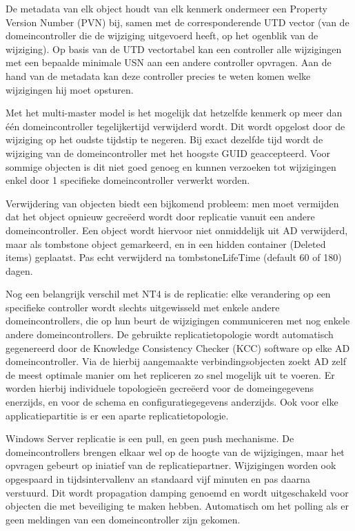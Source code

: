 De metadata van elk object houdt van elk kenmerk ondermeer een Property Version
Number (PVN) bij, samen met de corresponderende UTD vector (van de
domeincontroller die de wijziging uitgevoerd heeft, op het ogenblik van de
wijziging). Op basis van de UTD vectortabel kan een controller alle wijzigingen
met een bepaalde minimale USN aan een andere controller opvragen. Aan de hand
van de metadata kan deze controller precies te weten komen welke wijzigingen hij
moet opsturen.

Met het multi-master model is het mogelijk dat hetzelfde kenmerk op meer dan één
domeincontroller tegelijkertijd verwijderd wordt. Dit wordt opgelost door de
wijziging op het oudste tijdstip te negeren. Bij exact dezelfde tijd wordt de
wijziging van de domeincontroller met het hoogste GUID geaccepteerd. Voor
sommige objecten is dit niet goed genoeg en kunnen verzoeken tot wijzigingen
enkel door 1 specifieke domeincontroller verwerkt worden.

Verwijdering van objecten biedt een bijkomend probleem: men moet vermijden dat
het object opnieuw gecreëerd wordt door replicatie vanuit een andere
domeincontroller. Een object wordt hiervoor niet onmiddelijk uit AD verwijderd,
maar als tombstone object gemarkeerd, en in een hidden container (Deleted items)
geplaatst. Pas echt verwijderd na tombstoneLifeTime (default 60 of 180) dagen.

Nog een belangrijk verschil met NT4 is de  replicatie:
elke verandering op een specifieke controller wordt slechts uitgewisseld met
enkele andere domeincontrollers, die op hun beurt de wijzigingen communiceren
met nog enkele andere domeincontrollers. De gebruikte replicatietopologie wordt
automatisch gegenereerd door de Knowledge Consistency Checker (KCC) software op
elke AD domeincontroller. Via de hierbij aangemaakte verbindingsobjecten zoekt
AD zelf de meest optimale manier om het repliceren zo snel mogelijk uit te
voeren. Er worden hierbij individuele topologieën gecreëerd voor de
domeingegevens enerzijds, en voor de schema en configuratiegegevens anderzijds.
Ook voor elke applicatiepartitie is er een aparte replicatietopologie.

Windows Server replicatie is een pull, en geen push mechanisme. De
domeincontrollers brengen elkaar wel op de hoogte van de wijzigingen, maar het
opvragen gebeurt op iniatief van de replicatiepartner. Wijzigingen worden ook
opgespaard in tijdsintervallenv an standaard vijf minuten en pas daarna
verstuurd. Dit wordt propagation damping genoemd en wordt uitgeschakeld voor
objecten die met beveiliging te maken hebben. Automatisch om het polling als er
geen meldingen van een domeincontroller zijn gekomen.

